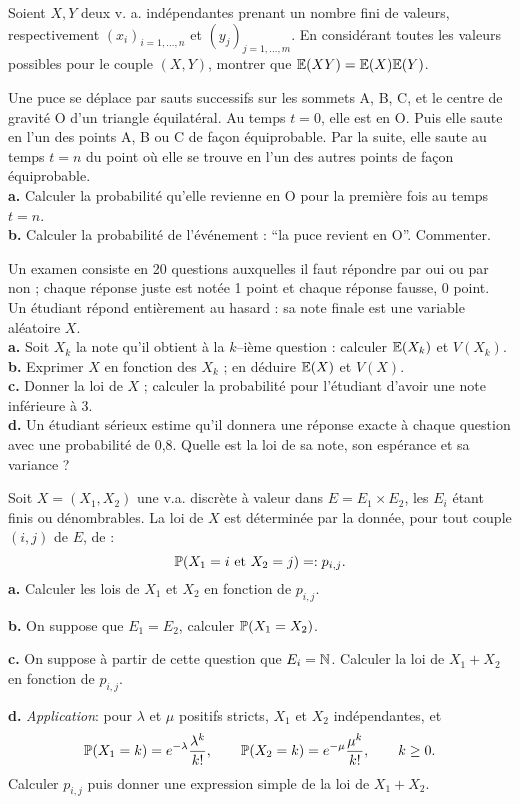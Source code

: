 \begin{exo}Soient $X,Y$ deux v. a. indépendantes prenant un nombre
fini de valeurs, respectivement $(x_i)_{i=1,\ldots,n}$ et $(y_j)_{j=1,\ldots,m}$. 
En considérant toutes les valeurs possibles pour le couple
$(X,Y)$, montrer que $\E(XY)=\E(X)\E(Y)$.
\end{exo}


\begin{exo} Une puce se déplace par sauts successifs sur les sommets A, B, C, et le centre de gravité O d'un triangle équilatéral. Au temps $t=0$, elle est en O. Puis elle saute en l'un des points A, B ou C de façon équiprobable. Par la suite, elle saute au temps $t=n$ du point où elle se trouve en l'un des autres points de façon équiprobable.
\\
\textbf{a.} Calculer la probabilité qu'elle revienne en O pour la première fois au temps $t=n$.
\\
\textbf{b.} Calculer la probabilité de l'événement : ``la puce revient en O''. Commenter.
\end{exo}


\begin{exo} Un examen consiste en 20 questions auxquelles il faut répondre par oui ou par non ; 
chaque réponse juste est notée 1 point et chaque réponse fausse, 0 point. 
Un étudiant répond entièrement au hasard : sa note finale est une variable aléatoire $X$.
\\
\textbf{a.} Soit $X_k$ la note qu'il obtient à la $k$--ième question : calculer 
$\E(X_k)$ et $V(X_k)$.
\\
\textbf{b.} Exprimer $X$ en fonction des $X_k$ ; en déduire $\E(X)$ et $V(X)$.
\\
\textbf{c.} Donner la loi de $X$ ; calculer la probabilité pour l'étudiant d'avoir une note inférieure à 3. 
\\
\textbf{d.} Un étudiant sérieux estime qu'il donnera une réponse exacte à chaque question avec une probabilité de 0,8. 
Quelle est la loi de sa note, son espérance et sa variance ? 
\end{exo}


\begin{exo} Soit $X = (X_1,X_2)$ une v.a. discrète à valeur dans $E=E_1\times E_2$, les $E_i$ étant finis ou dénombrables. La loi de $X$ est déterminée par la donnée, pour tout couple $(i,j)$ de $E$, de :
$$
\P({X_1=i \text{ et } X_2=j}) =: p_{i,j}.
$$
\noindent \textbf{a.} Calculer les lois de $X_1$ et $X_2$ en fonction de $p_{i,j}$.

\noindent \textbf{b.} On suppose que $E_1=E_2$, calculer $\P({X_1=X_2})$.

\noindent\textbf{c.} On suppose à partir de cette question que $E_i=\N$. 
Calculer la loi de $X_1+X_2$ en fonction de $p_{i,j}$.

\noindent\textbf{d.} \textit{Application}: pour $\lambda$ et $\mu$ positifs stricts, $X_1$ et $X_2$ indépendantes, et 
$$
\P({X_1=k}) = e^{-\lambda}\frac{\lambda^k}{k!}, \qquad 
\P({X_2=k}) = e^{-\mu}\frac{\mu^k}{k!}, \qquad k\geq 0. 
$$
Calculer $p_{i,j}$ puis donner une expression simple de la loi de $X_1+X_2$.
\end{exo}


